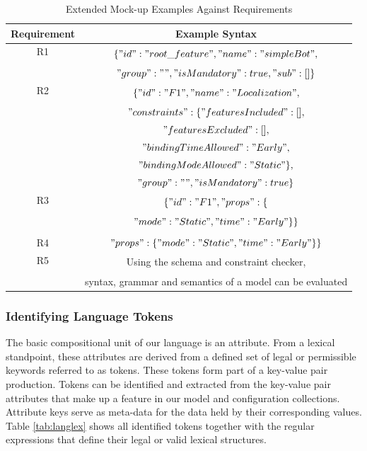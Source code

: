 \documentclass[conference]{IEEEtran}
\begin{document}
\begin{table}[H]
\caption{Extended Mock-up Examples Against Requirements}
\begin{center}
\begin{tabular}{|c|c|}
\hline
    Requirement & Example Syntax  \\ \hline
     R1 & \multirow{2}{*}{$\{"id":"root\_feature","name":"simpleBot",$}\\
                        & \\
                        & $"group": "","isMandatory": true,"sub": []\}$\\ \hline
     R2 & \multirow{2}{*}{$\{"id": "F1","name": "Localization",$}\\ 
                        & \\
                        & $"constraints": \{"featuresIncluded": [],$\\ 
                        & $"featuresExcluded": [],$\\
                        &$"bindingTimeAllowed":"Early",$ \\
                        & $"bindingModeAllowed":"Static"\},$\\ 
                        & $"group": "","isMandatory": true\}$ \\
                         \hline
     R3 &  \multirow{2}{*}{$\{"id": "F1","props": \{$}\\
            & \\
            & $"mode": "Static","time": "Early"\}\}$\\
            & \\
            \hline
     R4 & $"props": \{"mode": "Static","time": "Early"\}\}$\\ \hline
     R5 & \multirow{2}{*}{Using the schema and constraint checker,}\\ 
        & \\
        & syntax, grammar and semantics of a model can be evaluated\\ \hline
\end{tabular}
\label{tab:reqext}
\end{center}
\end{table}

\subsubsection{Identifying Language Tokens}
The basic compositional unit of our language is an attribute. From a lexical standpoint, these attributes are derived from a defined set of legal or permissible keywords referred to as tokens. These tokens form part of a key-value pair production. Tokens can be identified and extracted from the key-value pair attributes that make up a feature in our model and configuration collections. Attribute keys serve as meta-data for the data held by their corresponding values. Table \ref{tab:langlex} shows all identified tokens together with the regular expressions that define their legal or valid lexical structures.
\end{document}
